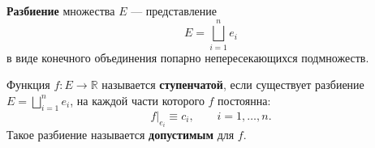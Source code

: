 \label{definition:20}

\begin{definition}
\textbf{Разбиение} множества $E$ --- представление
\[
  E=\bigsqcup_{i=1}^{n}e_i
\]
в виде конечного объединения попарно непересекающихся подмножеств.
\end{definition}

\begin{definition}
Функция $f:E\to\mathbb R$ называется \textbf{ступенчатой}, если существует разбиение $E=\bigsqcup_{i=1}^{n}e_i$, на каждой части которого $f$ постоянна:
\[
  f|_{e_i}\equiv c_i,\qquad i=1,\ldots,n.
\]
Такое разбиение называется \textbf{допустимым} для $f$.
\end{definition}
